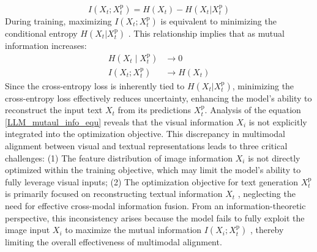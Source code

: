 \begin{equation} 
\textstyle
I(X_t; X_t^{\text{p}}) = H(X_t) - H(X_t | X_t^{\text
{p}})
\label{LLM_mutaul_info_equ}
\end{equation}
During training, maximizing $I(X_t; X_t^{\text{p}})$ is equivalent to minimizing the conditional entropy $H(X_t | X_t^{\text{p}})$
. This relationship implies that as mutual information increases:
\begin{equation}
\begin{aligned}
H(X_t \mid X_t^{\text{p}}) &\to 0 \\
I(X_t; X_t^{\text{p}}) &\to H(X_t)
\end{aligned}
\end{equation}
Since the cross-entropy loss is inherently tied to $H(X_t | X_t^{\text{p}})$, minimizing the cross-entropy loss effectively reduces uncertainty, enhancing the model’s ability to reconstruct the input text $X_t$ from its predictions $X_t^{\text{p}}$. Analysis of the equation \ref{LLM_mutaul_info_equ} reveals that the visual information $X_i$ is not explicitly integrated into the optimization objective. This discrepancy in multimodal alignment between visual and textual representations leads to three critical challenges:
(1) The feature distribution of image information $X_i$ is not directly optimized within the training objective, which may limit the model's ability to fully leverage visual inputs;
(2) The optimization objective for text generation $X_t^{\text{p}}$ is primarily focused on reconstructing textual information $X_t$
, neglecting the need for effective cross-modal information fusion.
From an information-theoretic perspective, this inconsistency arises because the model fails to fully exploit the image input $X_i$ to maximize the mutual information $I(X_i; X_t^{\text{p}})$
, thereby limiting the overall effectiveness of multimodal alignment.


